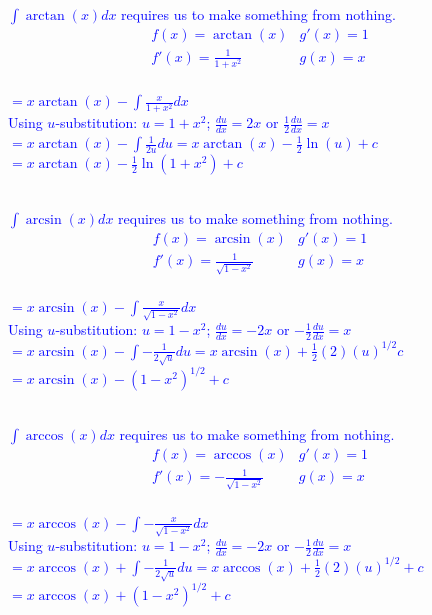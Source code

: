 \documentclass{ximera}
\begin{document}
\textcolor{blue}{$\int \arctan(x)dx$ requires us to make something from nothing.\\
\[\begin{array}{c|c}
    f(x)=\arctan(x) & g'(x)=1 \\ \hline
    f'(x)=\frac{1}{1+x^2} & g(x)=x
\end{array}\]\\
$=x\arctan(x)-\int \frac{x}{1+x^2}dx$\\
Using $u$-substitution: $u=1+x^2$; $\frac{du}{dx}=2x$ or $\frac{1}{2}\frac{du}{dx}=x$\\
$=x\arctan(x)-\int\frac{1}{2u}du=x\arctan(x)-\frac12\ln(u)+c$\\
$=x\arctan(x)-\frac12\ln(1+x^2)+c$\\
\\}

\textcolor{blue}{$\int\arcsin(x)dx$ requires us to make something from nothing.\\
\[\begin{array}{c|c}
    f(x)=\arcsin(x)& g'(x)=1 \\ \hline
    f'(x)=\frac{1}{\sqrt{1-x^2}} & g(x)=x
\end{array}\]\\
$=x\arcsin(x)-\int \frac{x}{\sqrt{1-x^2}}dx$\\
Using $u$-substitution: $u=1-x^2$; $\frac{du}{dx}=-2x$ or $-\frac{1}{2}\frac{du}{dx}=x$\\
$=x\arcsin(x)-\int-\frac{1}{2\sqrt{u}}du=x\arcsin(x)+\frac12(2)(u)^{1/2}c$\\
$=x\arcsin(x)-(1-x^2)^{1/2}+c$\\
\\}

\textcolor{blue}{
$\int\arccos(x)dx$ requires us to make something from nothing.\\
\[\begin{array}{c|c}
    f(x)=\arccos(x) & g'(x)=1 \\ \hline
    f'(x)=-\frac{1}{\sqrt{1-x^2}} & g(x)=x
\end{array}\]\\
$=x\arccos(x)-\int -\frac{x}{\sqrt{1-x^2}}dx$\\
Using $u$-substitution: $u=1-x^2$; $\frac{du}{dx}=-2x$ or $-\frac{1}{2}\frac{du}{dx}=x$\\
$=x\arccos(x)+\int-\frac{1}{2\sqrt{u}}du=x\arccos(x)+\frac12(2)(u)^{1/2}+c$\\
$=x\arccos(x)+(1-x^2)^{1/2}+c$
}
\end{document}
